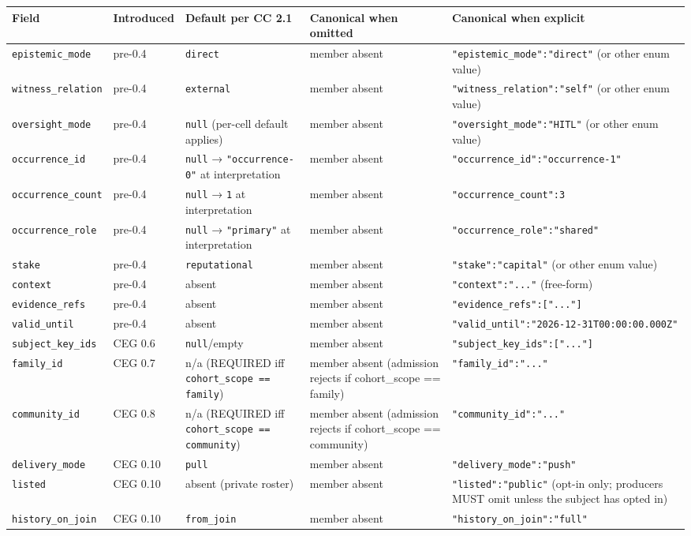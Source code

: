 \documentclass[11pt]{article}
\begin{document}
{\scriptsize
\begin{longtable}{|p{3.2cm}|p{3.2cm}|p{3.2cm}|p{3.2cm}|p{3.2cm}|}\hline
\textbf{Field} & \textbf{Introduced} & \textbf{Default per CC 2.1} & \textbf{Canonical when omitted} & \textbf{Canonical when explicit} \\ \hline\endhead
\texttt{epistemic\_mode} & pre-0.4 & \texttt{direct} & member absent & \texttt{"epistemic\_mode":"direct"} (or other enum value) \\ \hline
\texttt{witness\_relation} & pre-0.4 & \texttt{external} & member absent & \texttt{"witness\_relation":"self"} (or other enum value) \\ \hline
\texttt{oversight\_mode} & pre-0.4 & \texttt{null} (per-cell default applies) & member absent & \texttt{"oversight\_mode":"HITL"} (or other enum value) \\ \hline
\texttt{occurrence\_id} & pre-0.4 & \texttt{null} → \texttt{"occurrence-0"} at interpretation & member absent & \texttt{"occurrence\_id":"occurrence-1"} \\ \hline
\texttt{occurrence\_count} & pre-0.4 & \texttt{null} → \texttt{1} at interpretation & member absent & \texttt{"occurrence\_count":3} \\ \hline
\texttt{occurrence\_role} & pre-0.4 & \texttt{null} → \texttt{"primary"} at interpretation & member absent & \texttt{"occurrence\_role":"shared"} \\ \hline
\texttt{stake} & pre-0.4 & \texttt{reputational} & member absent & \texttt{"stake":"capital"} (or other enum value) \\ \hline
\texttt{context} & pre-0.4 & absent & member absent & \texttt{"context":"..."} (free-form) \\ \hline
\texttt{evidence\_refs} & pre-0.4 & absent & member absent & \texttt{"evidence\_refs":["..."]} \\ \hline
\texttt{valid\_until} & pre-0.4 & absent & member absent & \texttt{"valid\_until":"2026-12-31T00:00:00.000Z"} \\ \hline
\texttt{subject\_key\_ids} & CEG 0.6 & \texttt{null}/empty & member absent & \texttt{"subject\_key\_ids":["..."]} \\ \hline
\texttt{family\_id} & CEG 0.7 & n/a (REQUIRED iff \texttt{cohort\_scope == family}) & member absent (admission rejects if cohort\_scope == family) & \texttt{"family\_id":"..."} \\ \hline
\texttt{community\_id} & CEG 0.8 & n/a (REQUIRED iff \texttt{cohort\_scope == community}) & member absent (admission rejects if cohort\_scope == community) & \texttt{"community\_id":"..."} \\ \hline
\texttt{delivery\_mode} & CEG 0.10 & \texttt{pull} & member absent & \texttt{"delivery\_mode":"push"} \\ \hline
\texttt{listed} & CEG 0.10 & absent (private roster) & member absent & \texttt{"listed":"public"} (opt-in only; producers MUST omit unless the subject has opted in) \\ \hline
\texttt{history\_on\_join} & CEG 0.10 & \texttt{from\_join} & member absent & \texttt{"history\_on\_join":"full"} \\ \hline
\end{longtable}}
\end{document}
